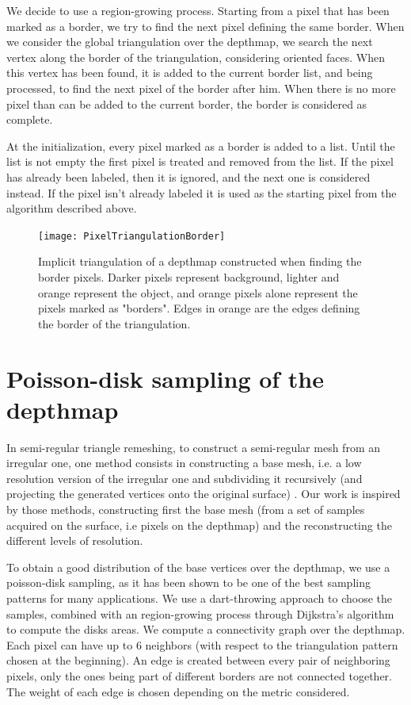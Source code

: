 \documentclass[11pt,fleqn]{book} %
\begin{document}
We decide to use a region-growing process. 
Starting from a pixel that has been marked as a border, we try to find the next pixel defining the same border. 
When we consider the global triangulation over the depthmap, we search the next vertex along the border of the triangulation, considering oriented faces.
When this vertex has been found, it is added to the current border list, and being processed, to find the next pixel of the border after him.
When there is no more pixel than can be added to the current border, the border is considered as complete.

At the initialization, every pixel marked as a border is added to a list. Until the list is not empty the first pixel is treated and removed from the list. If the pixel has already been labeled, then it is ignored, and the next one is considered instead. If the pixel isn't already labeled it is used as the starting pixel from the algorithm described above.

\begin{figure}[ht]
\centering
\texttt{[image: PixelTriangulationBorder]}
\caption{Implicit triangulation of a depthmap constructed when finding the border pixels. Darker pixels represent background, lighter and orange represent the object, and orange pixels alone represent the pixels marked as "borders".
Edges in orange are the edges defining the border of the triangulation.}
\label{fig:border_triangulation}
\end{figure}

\section{Poisson-disk sampling of the depthmap}
\label{sec:poisson_sampling}

In semi-regular triangle remeshing, to construct a semi-regular mesh from an irregular one, one method consists in constructing a base mesh, i.e. a low resolution version of the irregular one and subdividing it recursively (and projecting the generated vertices onto the original surface) \cite{PRS15}. Our work is inspired by those methods, constructing first the base mesh (from a set of samples acquired on the surface, i.e pixels on the depthmap) and the reconstructing the different levels of resolution.

To obtain a good distribution of the base vertices over the depthmap, we use a poisson-disk sampling, as it has been shown to be one of the best sampling patterns for many applications. 
We use a dart-throwing approach to choose the samples, combined with an region-growing process through Dijkstra's algorithm \cite{Dij59} to compute the disks areas.
We compute a connectivity graph over the depthmap. Each pixel can have up to 6 neighbors (with respect to the triangulation pattern chosen at the beginning).
An edge is created between every pair of neighboring pixels, only the ones being part of different borders are not connected together. 
The weight of each edge is chosen depending on the metric considered.
\end{document}
